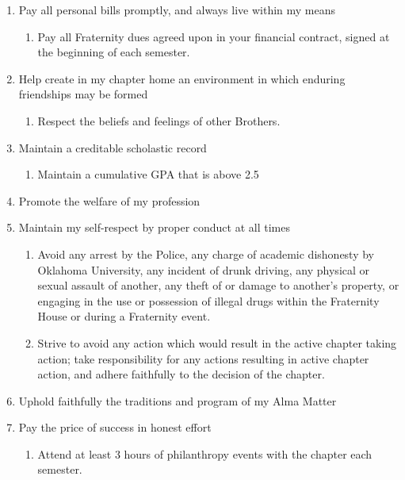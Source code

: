 \documentclass{article}
\begin{document}
\begin{enumerate}
\begin{enumerate}
    \end{enumerate}
    \item Pay all personal bills promptly, and always live within my means
    \begin{enumerate}
        \item Pay all Fraternity dues agreed upon in your financial contract, signed at the beginning of each semester.
    \end{enumerate}
    \item Help create in my chapter home an environment in which enduring friendships may be formed
    \begin{enumerate}
        \item Respect the beliefs and feelings of other Brothers.
    \end{enumerate}
    \item Maintain a creditable scholastic record
    \begin{enumerate}
        \item Maintain a cumulative GPA that is above 2.5
    \end{enumerate}
    \item Promote the welfare of my profession
    \item Maintain my self-respect by proper conduct at all times
    \begin{enumerate}
        \item Avoid any arrest by the Police, any charge of academic dishonesty by Oklahoma University, any incident of drunk driving, any physical or sexual assault of another, any theft of or damage to another’s property, or engaging in the use or possession of illegal drugs within the Fraternity House or during a Fraternity event.
        \item Strive to avoid any action which would result in the active chapter taking action; take responsibility for any actions resulting in active chapter action, and adhere faithfully to the decision of the chapter.
    \end{enumerate}
    \item Uphold faithfully the traditions and program of my Alma Matter
    \item Pay the price of success in honest effort
    \begin{enumerate}
        \item Attend at least 3 hours of philanthropy events with the chapter each semester.
    \end{enumerate}
\end{enumerate}
\end{document}
